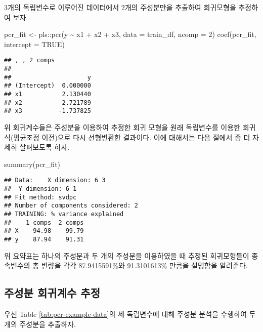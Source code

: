 \documentclass[
]{book}
\newenvironment{Shaded}{\begin{snugshade}}{\end{snugshade}}
\newcommand{\AttributeTok}[1]{\textcolor[rgb]{0.77,0.63,0.00}{#1}}
\newcommand{\ConstantTok}[1]{\textcolor[rgb]{0.00,0.00,0.00}{#1}}
\newcommand{\DecValTok}[1]{\textcolor[rgb]{0.00,0.00,0.81}{#1}}
\newcommand{\FunctionTok}[1]{\textcolor[rgb]{0.00,0.00,0.00}{#1}}
\newcommand{\NormalTok}[1]{#1}
\newcommand{\OtherTok}[1]{\textcolor[rgb]{0.56,0.35,0.01}{#1}}
\newcommand{\SpecialCharTok}[1]{\textcolor[rgb]{0.00,0.00,0.00}{#1}}
\begin{document}
3개의 독립변수로 이루어진 데이터에서 2개의 주성분만을 추출하여 회귀모형을 추정하여 보자.

\begin{Shaded}
\begin{Highlighting}[]
\NormalTok{pcr\_fit }\OtherTok{\textless{}{-}}\NormalTok{ pls}\SpecialCharTok{::}\FunctionTok{pcr}\NormalTok{(y }\SpecialCharTok{\textasciitilde{}}\NormalTok{ x1 }\SpecialCharTok{+}\NormalTok{ x2 }\SpecialCharTok{+}\NormalTok{ x3, }\AttributeTok{data =}\NormalTok{ train\_df, }\AttributeTok{ncomp =} \DecValTok{2}\NormalTok{)}
\FunctionTok{coef}\NormalTok{(pcr\_fit, }\AttributeTok{intercept =} \ConstantTok{TRUE}\NormalTok{)}
\end{Highlighting}
\end{Shaded}

\begin{verbatim}
## , , 2 comps
## 
##                     y
## (Intercept)  0.000000
## x1           2.130440
## x2           2.721789
## x3          -1.737825
\end{verbatim}

위 회귀계수들은 주성분을 이용하여 추정한 회귀 모형을 원래 독립변수를 이용한 회귀식(평균조정 이전)으로 다시 선형변환한 결과이다. 이에 대해서는 다음 절에서 좀 더 자세히 살펴보도록 하자.

\begin{Shaded}
\begin{Highlighting}[]
\FunctionTok{summary}\NormalTok{(pcr\_fit)}
\end{Highlighting}
\end{Shaded}

\begin{verbatim}
## Data:    X dimension: 6 3 
##  Y dimension: 6 1
## Fit method: svdpc
## Number of components considered: 2
## TRAINING: % variance explained
##    1 comps  2 comps
## X    94.98    99.79
## y    87.94    91.31
\end{verbatim}

위 요약표는 하나의 주성분과 두 개의 주성분을 이용하였을 때 추정된 회귀모형들이 종속변수의 총 변량을 각각 87.9415591\%와 91.3101613\% 만큼을 설명함을 알려준다.

\hypertarget{pcr-regression-coefficient}{%
\subsection{주성분 회귀계수 추정}\label{pcr-regression-coefficient}}

우선 Table \ref{tab:pcr-example-data}의 세 독립변수에 대해 주성분 분석을 수행하여 두 개의 주성분을 추출하자.
\end{document}
